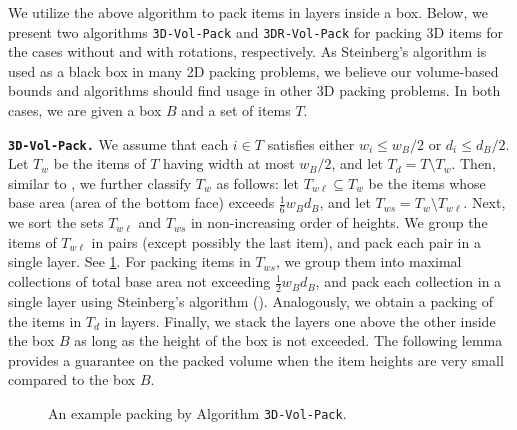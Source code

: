We utilize the above algorithm to pack items in layers inside a box. Below, we present two algorithms \texttt{3D-Vol-Pack} and \texttt{3DR-Vol-Pack} for packing 3D items for the cases without and with rotations, respectively. As Steinberg's algorithm is used as a black box in many 2D packing problems, we believe our volume-based bounds and algorithms should find usage in other 3D packing problems. In both cases, we are given a box $B$ and a set of items $T$.

\noindent \textbf{\texttt{3D-Vol-Pack.}} We assume that each $i\in T$ satisfies either $w_i \le w_B/2$ or $d_i \le d_B/2$. 
Let $T_w$ be the items of $T$ having width at most $w_B/2$, and let $T_d = T\setminus T_w$. Then, similar to \cite{3d-knapsack}, we further classify $T_w$ as follows: let $T_{w\ell}\subseteq T_w$ be the items whose base area (area of the bottom face) exceeds $\frac{1}{6}w_Bd_B$, and let $T_{ws} = T_w \setminus T_{w\ell}$. Next, we sort the sets $T_{w\ell}$ and $T_{ws}$ in non-increasing order of heights. We group the items of $T_{w\ell}$ in pairs (except possibly the last item), and pack each pair in a single layer. See \cref{fig:3d-vol-pack}. For packing items in $T_{ws}$, we group them into maximal collections of total base area not exceeding $\frac{1}{2}w_Bd_B$, and pack each collection in a single layer using Steinberg's algorithm (). Analogously, we obtain a packing of the items in $T_d$ in layers. Finally, we stack the layers one above the other inside the box $B$ as long as the height of the box is not exceeded. The following lemma provides a guarantee on the packed volume 
when the item heights are very small compared to the box $B$. 

\begin{figure}
    \centering
    
    \caption{An example packing by Algorithm \texttt{3D-Vol-Pack}.}
    \label{fig:3d-vol-pack}
\end{figure}



